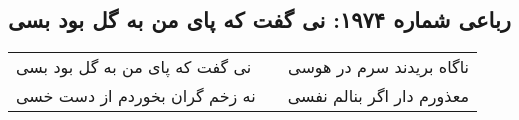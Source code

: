 \begin{center}
\section*{رباعی شماره ۱۹۷۴: نی گفت که پای من به گل بود بسی}
\label{sec:1974}
\begin{longtable}{l p{0.5cm} r}
نی گفت که پای من به گل بود بسی
&&
ناگاه بریدند سرم در هوسی
\\
نه زخم گران بخوردم از دست خسی
&&
معذورم دار اگر بنالم نفسی
\\
\end{longtable}
\end{center}
